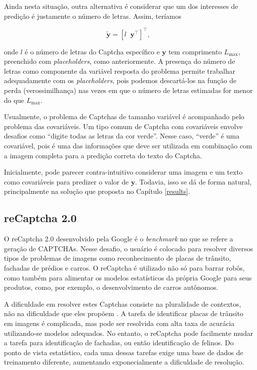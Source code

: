 \documentclass[12pt,]{report}
\begin{document}
Ainda nesta situação, outra alternativa é considerar que um dos
interesses de predição é justamente o número de letras. Assim, teríamos

\[
\tilde{\mathbf{y}} = \left[l \;\; \mathbf y^\top \right]^\top,
\]

onde \(l\) é o número de letras do Captcha específico e \(\mathbf y\)
tem comprimento \(L_{\max}\), preenchido com \emph{placeholders}, como
anteriormente. A presença do número de letras como componente da
variável resposta do problema permite trabalhar adequadamente com os
\emph{placeholders}, pois podemos descartá-los na função de perda
(verossimilhança) nas vezes em que o número de letras estimadas for
menor do que \(L_{\max}\).

Usualmente, o problema de Captchas de tamanho variável é acompanhado
pelo problema das covariáveis. Um tipo comum de Captcha com covariáveis
envolve desafios como ``digite todas as letras da cor verde''. Nesse
caso, ``verde'' é uma covariável, pois é uma das informações que deve
ser utilizada em combinação com a imagem completa para a predição
correta do texto do Captcha.

Inicialmente, pode parecer contra-intuitivo considerar uma imagem e um
texto como covariáveis para predizer o valor de \(\mathbf y\). Todavia,
isso se dá de forma natural, principalmente na solução que proposta no
Capítulo \ref{results}.

\subsection{reCaptcha 2.0}\label{recaptcha-2.0}

O reCaptcha 2.0 desenvolvido pela Google é o \emph{benchmark} no que se
refere a geração de CAPTCHAs. Nesse desafio, o usuário é colocado para
resolver diversos tipos de problemas de imagens como reconhecimento de
placas de trânsito, fachadas de prédios e carros. O reCaptcha é
utilizado não só para barrar robôs, como também para alimentar os
modelos estatísticos da própria Google para seus produtos, como, por
exemplo, o desenvolvimento de carros autônomos.

A dificuldade em resolver estes Captchas consiste na pluralidade de
contextos, não na dificuldade que eles propõem
\citep{goodfellow2013multi}. A tarefa de identificar placas de trânsito
em imagens é complicada, mas pode ser resolvida com alta taxa de
acurácia utilizando-se modelos adequados. No entanto, o reCaptcha pode
facilmente mudar a tarefa para identificação de fachadas, ou então
identificação de felinos. Do ponto de vista estatístico, cada uma dessas
tarefas exige uma base de dados de treinamento diferente, aumentando
exponecialmente a dificuldade de resolução.
\end{document}
